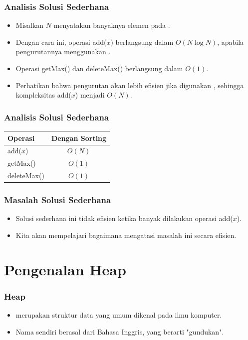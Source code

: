 \begin{frame}
\frametitle{Analisis Solusi Sederhana}
\begin{itemize}
  \item Misalkan $N$ menyatakan banyaknya elemen pada \farray.
  \item Dengan cara ini, operasi add($x$) berlangsung dalam $O(N \log{N})$, apabila pengurutannya menggunakan .
  \item Operasi getMax() dan deleteMax() berlangsung dalam $O(1)$.
  \newline
  \item Perhatikan bahwa pengurutan akan lebih efisien jika digunakan , sehingga kompleksitas add($x$) menjadi $O(N)$.
\end{itemize}
\end{frame}

\begin{frame}
\frametitle{Analisis Solusi Sederhana}
\begin{table}[ht]
  \begin{tabular}{|l|c|}
    \hline Operasi  & Dengan Sorting\\
    \hline  add($x$) & $O(N)$  \\
    \hline  getMax() & $O(1)$ \\
    \hline  deleteMax() & $O(1)$ \\
    \hline
  \end{tabular}
\end{table}  
\end{frame}

\begin{frame}
\frametitle{Masalah Solusi Sederhana}
\begin{itemize}
  \item Solusi sederhana ini tidak efisien ketika banyak dilakukan operasi add($x$).
  \item Kita akan mempelajari bagaimana \pheap mengatasi masalah ini secara efisien.
\end{itemize}
\end{frame}

\section{Pengenalan Heap}
\frame{\sectionpage}

\begin{frame}
\frametitle{Heap}
\begin{itemize}
  \item \pHeap merupakan struktur data yang umum dikenal pada ilmu komputer.
  \item Nama \pheap sendiri berasal dari Bahasa Inggris, yang berarti "gundukan". 
\end{itemize}
\end{frame}

